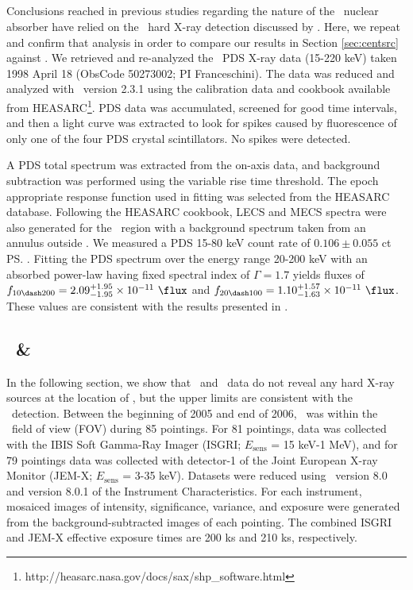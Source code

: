 \documentclass[useAMS,usenatbib]{mn2e}
\begin{document}
\subsection{\bepposax}
\label{sec:beppo}

Conclusions reached in previous studies regarding the nature of the
\irs\ nuclear absorber have relied on the \bepposax\ hard X-ray
detection discussed by \citet{2000A&A...353..910F}. Here, we repeat
and confirm that analysis in order to compare our results in Section
\ref{sec:centsrc} against \citet{2000A&A...353..910F}. We retrieved
and re-analyzed the \bepposax\ PDS X-ray data (15-220 keV) taken 1998
April 18 (ObsCode 50273002; PI Franceschini). The data was reduced and
analyzed with \saxdas\ version 2.3.1 using the calibration data and
cookbook available from
HEASARC\footnote{http://heasarc.nasa.gov/docs/sax/shp\_software.html}. PDS
data was accumulated, screened for good time intervals, and then a
light curve was extracted to look for spikes caused by fluorescence of
only one of the four PDS crystal scintillators. No spikes were
detected.

A PDS total spectrum was extracted from the on-axis data, and
background subtraction was performed using the variable rise time
threshold. The epoch appropriate response function used in fitting was
selected from the HEASARC database. Following the HEASARC cookbook,
LECS and MECS spectra were also generated for the \rf\ region with a
background spectrum taken from an annulus outside \rf. We measured a
PDS 15-80 keV count rate of $0.106 \pm 0.055$ ct \ps. Fitting the PDS
spectrum over the energy range 20-200 keV with an absorbed power-law
having fixed spectral index of $\Gamma = 1.7$ yields fluxes of $f_{10
  \dash 200} = 2.09^{+1.95}_{-1.95} \times 10^{-11} ~\flux$ and $f_{20
  \dash 100} = 1.10^{+1.57}_{-1.63} \times 10^{-11} ~\flux$. These
values are consistent with the results presented in
\citet{2000A&A...353..910F}.

\subsection{\integral\ \& \swift}
\label{sec:integral}

In the following section, we show that \integral\ and \swift\ data do
not reveal any hard X-ray sources at the location of \irs, but the
upper limits are consistent with the \bepposax\ detection. Between the
beginning of 2005 and end of 2006, \irs\ was within the
\integral\ field of view (FOV) during 85 pointings. For 81 pointings,
data was collected with the IBIS Soft Gamma-Ray Imager (ISGRI;
$E_{\mathrm{sens}}$ = 15 keV-1 MeV), and for 79 pointings data was
collected with detector-1 of the Joint European X-ray Monitor (JEM-X;
$E_{\mathrm{sens}}$ = 3-35 keV). Datasets were reduced using
\osa\ version 8.0 and version 8.0.1 of the Instrument
Characteristics. For each instrument, mosaiced images of intensity,
significance, variance, and exposure were generated from the
background-subtracted images of each pointing. The combined ISGRI and
JEM-X effective exposure times are 200 ks and 210 ks, respectively.
\end{document}
